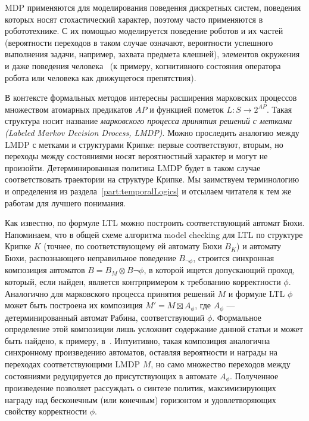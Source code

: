 \documentclass[conference]{IEEEtran}
\begin{document}
MDP применяются для моделирования поведения дискретных систем, поведения которых 
носят стохастический характер, поэтому часто применяются в робототехнике. 
С их помощью моделируется поведение роботов и их частей (вероятности 
переходов в таком случае означают, вероятности успешного выполнения задачи, 
например, захвата предмета клешней), элементов окружения и даже 
поведения человека~\cite{pentland1999modeling, rothkopf2013modular, mcghan2015human} 
(к примеру, когнитивного состояния оператора робота или человека как движущегося 
препятствия).

В контексте формальных методов интересны расширения марковских процессов 
множеством атомарных предикатов $AP$ и функцией пометок $L: S\rightarrow{}2^{AP}$. 
Такая структура носит название \textit{марковского процесса принятия решений с 
метками (Labeled Markov Decision Drocess, LMDP)}. Можно проследить аналогию между 
LMDP с метками и структурами Крипке: первые соответствуют, вторым, но 
переходы между состояниями носят вероятностный характер и могут не произойти. 
Детерминированная политика LMDP будет в таком случае соответствовать траектории 
на структуре Крипке. Мы заимствуем терминологию и определения из раздела~\ref{part:temporalLogics}
и отсылаем читателя к тем же работам для лучшего понимания.

Как известно, по формуле LTL можно построить соответствующий автомат Бюхи. 
Напоминаем, что в общей схеме алгоритма model checking для LTL по структуре 
Крипке $K$ (точнее, по соответствующему ей автомату Бюхи $B_K$) и автомату Бюхи, 
распознающего неправильное поведение $B_{\neg\phi}$, строится синхронная 
композиция автоматов $B = B_M\otimes{}B{\neg\phi}$, в которой ищется 
допускающий проход, который, если найден, является контрпримером к требованию 
корректности $\phi$. Аналогично для марковского процесса принятия решений $M$ и 
формуле LTL $\phi$ может быть построена их композиция $M' = M \boxtimes A_\phi$, 
где $A_\phi$ --- детерминированный автомат Рабина, соответствующий $\phi$. 
Формальное определение этой композиции лишь усложнит содержание данной статьи 
и может быть найдено, к примеру, в~\cite{fu2014pareto}. Интуитивно, такая 
композиция аналогична синхронному произведению автоматов, оставляя вероятности 
и награды на переходах соответствующими LMDP $M$, но само множество переходов 
между состояниями редуцируется до присутствующих в автомате $A_\phi$. 
Полученное произведение позволяет рассуждать о синтезе политик, максимизирующих 
награду над бесконечным (или конечным) горизонтом и удовлетворяющих свойству 
корректности $\phi$.
\end{document}
